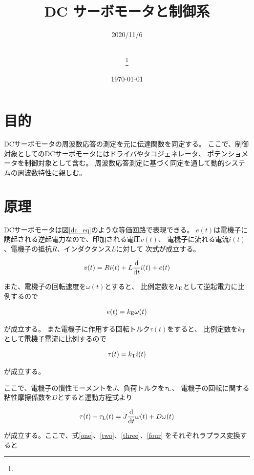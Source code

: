 \documentclass[uplatex, 11pt,a4j, titlepage]{jsarticle}
\title{DC サーボモータと制御系}
\date{\today}
\author{
    \small{\myid} \\
    \myname\thanks{\mymail}
}
\begin{document}
\maketitle


\subtitle{2020/11/6}

\section{目的}
DCサーボモータの周波数応答の測定を元に伝達関数を同定する。
ここで、制御対象としてのDCサーボモータにはドライバやタコジェネレータ、
ポテンショメータを制御対象として含む。
周波数応答測定に基づく同定を通して動的システムの周波数特性に親しむ。
\section{原理}
DCサーボモータは図\ref{dc_eq}のような等価回路で表現できる。
$e(t)$は電機子に誘起される逆起電力なので、印加される電圧$v(t)$、
電機子に流れる電流$i(t)$、電機子の抵抗$R$、インダクタンス$L$に対して
次式が成立する。

\begin{equation}\label{one}
    v(t) = Ri(t) + L\frac{\rm d}{{\rm d}t}i(t) + e(t)
\end{equation}

また、電機子の回転速度を$\omega (t)$とすると、
比例定数を$k_{\rm E}$として逆起電力に比例するので

\begin{equation}\label{two}
    e(t) = k_{\rm E} \omega (t)
\end{equation}

が成立する。
また電機子に作用する回転トルク$\tau (t)$をすると、
比例定数を$k_{\rm T}$として電機子電流に比例するので

\begin{equation}\label{three}
    \tau (t)=k_{\rm T} i(t)
\end{equation}

が成立する。

ここで、電機子の慣性モーメントを$J$、負荷トルクを$\tau_{\rm L}$、
電機子の回転に関する粘性摩擦係数を$D$とすると運動方程式より

\begin{equation}\label{four}
    \tau (t) - \tau_{\rm L}(t)
        = J \frac{\rm d}{{\rm d}t} \omega (t) + D\omega(t)
\end{equation}

が成立する。ここで、式\ref{one}、\ref{two}、\ref{three}、\ref{four}
をそれぞれラプラス変換すると
\end{document}
